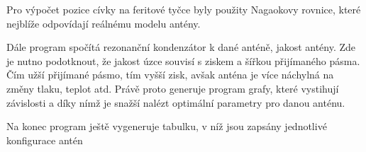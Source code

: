 Pro výpočet pozice cívky na feritové tyčce byly použity Nagaokovy rovnice, které nejblíže
odpovídají reálnému modelu antény.

Dále program spočítá rezonanční kondenzátor k dané anténě, jakost antény. Zde je nutno
podotknout, že jakost úzce souvisí s ziskem a šířkou přijímaného pásma. Čím užší
přijímané pásmo, tím vyšší zisk, avšak anténa je více náchylná na změny tlaku, teplot atd.
Právě proto generuje program grafy, které vystihují závislosti a díky nímž je snažší
nalézt optimální parametry pro danou anténu.

Na konec program ještě vygeneruje tabulku, v níž jsou zapsány jednotlivé konfigurace
antén \cite{book03}


